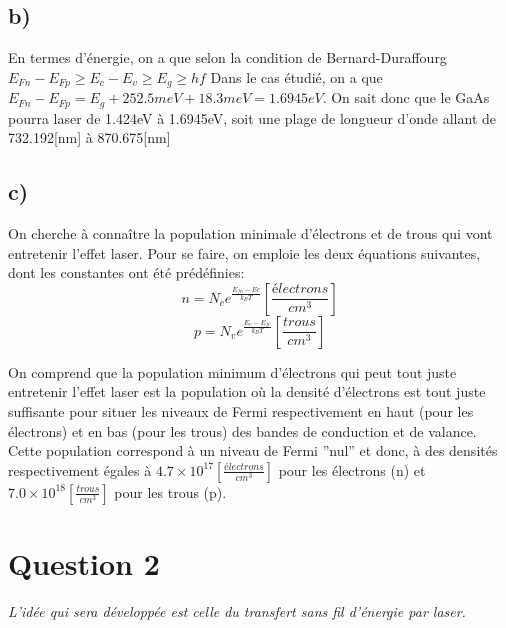 \section{b)}
En termes d'énergie, on a que selon la condition de Bernard-Duraffourg $E_{Fn} - E_{Fp} \geq E_c - E_v \geq E_g \geq hf$ Dans le cas étudié, on a que $E_{Fn} - E_{Fp} = E_g + 252.5meV + 18.3meV = 1.6945eV$. On sait donc que le GaAs pourra laser de 1.424eV à 1.6945eV, soit une plage de longueur d'onde allant de 732.192[nm] à 870.675[nm]

\section{c)}
On cherche à connaître la population minimale d'électrons et de trous qui vont entretenir l'effet laser. Pour se faire, on emploie les deux équations suivantes, dont les constantes ont été prédéfinies:
\begin{equation}
n = N_c e^{\frac{E_{fn} - Ec}{k_B T}} \left[\frac{électrons}{cm^3}\right]
\end{equation}
\begin{equation}
p = N_v e^{\frac{E_{v} - E_{fv}}{k_B T}}  \left[\frac{trous}{cm^3}\right]
\end{equation}

On comprend que la population minimum d'électrons qui peut tout juste entretenir l'effet laser est la population où la densité d'électrons est tout juste suffisante pour situer les niveaux de Fermi respectivement en haut (pour les électrons) et en bas (pour les trous) des bandes de conduction et de valance. Cette population correspond à un niveau de Fermi ''nul'' et donc, à des densités respectivement égales à $4.7\times 10^{17} \left[\frac{électrons}{cm^3}\right]$ pour les électrons (n) et $7.0\times 10^{18} \left[\frac{trous}{cm^3}\right]$ pour les trous (p).

\chapter{Question 2}
\textit{L'idée qui sera développée est celle du transfert sans fil d'énergie par laser.}

